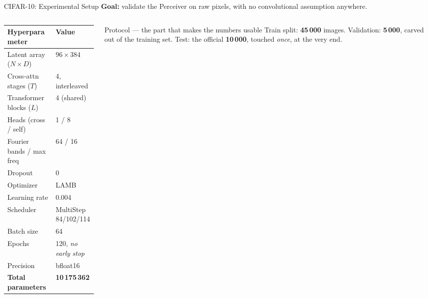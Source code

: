 \documentclass[aspectratio=169,11pt]{beamer}
\begin{document}


\begin{frame}[shrink=5]{CIFAR-10: Experimental Setup}
  \textbf{Goal:} validate the Perceiver on raw pixels, with no convolutional assumption anywhere.

  \vspace{0.3em}
  \begin{columns}[T]
    \begin{column}{0.46\textwidth}
      \begin{table}
        \centering\small
        \begin{tabular}{ll}
          \toprule
          \textbf{Hyperparameter} & \textbf{Value} \\
          \midrule
          Latent array ($N \times D$) & $96 \times 384$ \\
          Cross-attn stages ($T$) & 4, interleaved \\
          Transformer blocks ($L$) & 4 (shared) \\
          Heads (cross / self) & 1 / 8 \\
          Fourier bands / max freq & 64 / 16 \\
          Dropout & 0 \\
          \midrule
          Optimizer & LAMB \\
          Learning rate & 0.004 \\
          Scheduler & MultiStep 84/102/114 \\
          Batch size & 64 \\
          Epochs & 120, \emph{no early stop} \\
          Precision & bfloat16 \\
          \midrule
          \textbf{Total parameters} & \textbf{10\,175\,362} \\
          \bottomrule
        \end{tabular}
      \end{table}
    \end{column}
    \begin{column}{0.50\textwidth}
      \begin{block}{Protocol --- the part that makes the numbers usable}
        \small
        Train split: \textbf{45\,000} images. Validation: \textbf{5\,000}, carved out of the training set. Test: the official \textbf{10\,000}, touched \emph{once}, at the very end.


\end{block}
\end{column}
\end{columns}
\end{frame}
\end{document}
